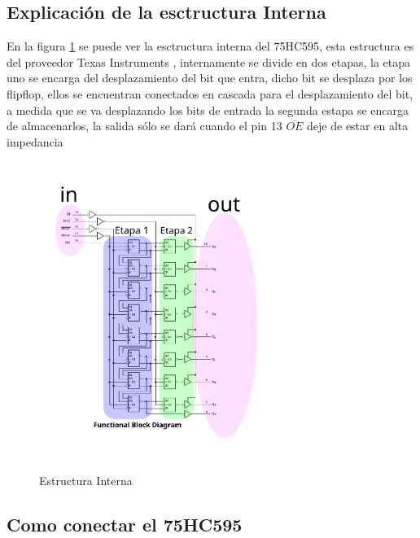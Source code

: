 \documentclass{article}
\begin{document}
\newpage
\subsection{Explicación de la esctructura Interna}

En la figura \ref{fig:Estructura Interna} se puede ver la esctructura interna del 75HC595, esta estructura es del proveedor Texas Instruments \cite{Datasheet}, internamente se divide en dos etapas, la etapa uno se encarga del desplazamiento del bit que entra, dicho bit se desplaza por los flipflop, ellos se encuentran conectados en cascada para el desplazamiento del bit, a medida que se va desplazando los bits de entrada la segunda estapa se encarga de almacenarlos, la salida sólo se dará cuando el pin 13 $\overline{OE}$ deje de estar en alta impedancia




\begin{figure}[H]
    \includegraphics[width=8cm,angle=0, height=10cm ]{imagen/estructuraInterna.pdf}
    \centering
    \caption{Estructura Interna \footnotemark}
    \label{fig:Estructura Interna}
    \end{figure}
    

\subsection{Como conectar el 75HC595}
\end{document}
